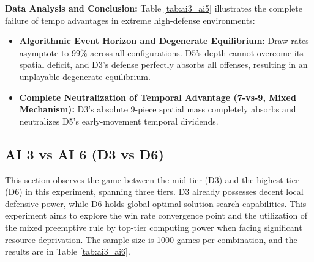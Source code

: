 \textbf{Data Analysis and Conclusion:} 
Table \ref{tab:ai3_ai5} illustrates the complete failure of tempo advantages in extreme high-defense environments:
\begin{itemize}
    \item \textbf{Algorithmic Event Horizon and Degenerate Equilibrium:} Draw rates asymptote to 99\% across all configurations. D5's depth cannot overcome its spatial deficit, and D3's defense perfectly absorbs all offenses, resulting in an unplayable degenerate equilibrium.
    \item \textbf{Complete Neutralization of Temporal Advantage (7-vs-9, Mixed Mechanism):} D3's absolute 9-piece spatial mass completely absorbs and neutralizes D5's early-movement temporal dividends.
\end{itemize}

\subsection{AI 3 vs AI 6 (D3 vs D6)}
\label{subsec:ai3_ai6}

This section observes the game between the mid-tier (D3) and the highest tier (D6) in this experiment, spanning three tiers. D3 already possesses decent local defensive power, while D6 holds global optimal solution search capabilities. This experiment aims to explore the win rate convergence point and the utilization of the mixed preemptive rule by top-tier computing power when facing significant resource deprivation. The sample size is 1000 games per combination, and the results are in Table \ref{tab:ai3_ai6}.

\begin{table}[htbp]
    \centering
    \caption{AI 3 vs AI 6 Simulation Data Distribution (Sample Size=1000)}
    \label{tab:ai3_ai6}
\end{table}

